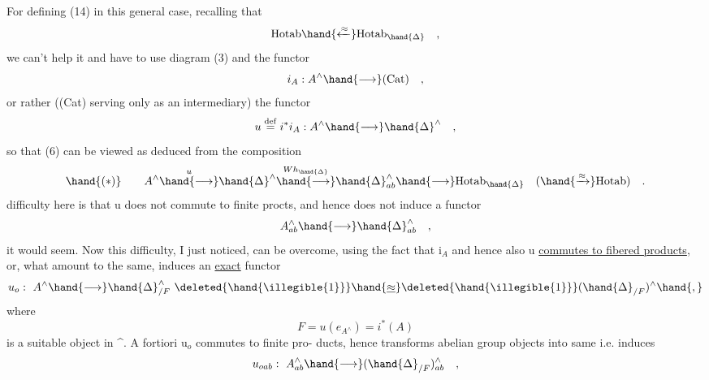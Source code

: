 For defining (14) in this general case, recalling that
\[ \mathrm{Hotab} \hand{\xleftarrow{\approx}} \mathrm{Hotab}_{\hand{\Delta}} \quad , \]
we can't help it and have to use diagram (3) and the functor
\[ i_{A} : A^{\wedge} \hand{\longrightarrow} (\mathrm{Cat}) \quad , \]
or rather ((Cat) serving only as an intermediary) the functor
\[ u \overset{\mathrm{def}}{=} i^{*} i_{A} : A^{\wedge} \hand{\longrightarrow} \hand{\Delta}^{\wedge} \quad , \]
so that (6) can be viewed as  deduced  from the
composition
\[ \hand{(*)} \qquad A^{\wedge} \overset{u}{\hand{\longrightarrow}} \hand{\Delta}^{\wedge} \overset{Wh_{\hand{\Delta}}}{\hand{\longrightarrow}} \hand{\Delta}^{\wedge}_{ab} \hand{\longrightarrow} \mathrm{Hotab}_{\hand{\Delta}} \quad ( \hand{\xrightarrow{\approx}} \mathrm{Hotab} ) \quad . \]
 difficulty here is that u does not commute to finite procts,
and hence does not induce a functor\xout{,} 
\[ A^{\wedge}_{ab} \hand{\longrightarrow} \hand{\Delta}^{\wedge}_{ab} \quad , \]
it would seem. Now this difficulty, I just noticed, can be overcome,
using the fact that i$_{A}$ and hence also u \uline{commutes to fibered products},
or, what amount to the same, induces an \uline{exact} functor
\[ u_{o} :\ A^{\wedge} \hand{\longrightarrow} \hand{\Delta}^{\wedge}_{/F} \ \deleted{\hand{\illegible{1}}}\hand{\underline{\approx}}\deleted{\hand{\illegible{1}}} (\hand{\Delta}_{/F})^{\wedge} \hand{,} \]
\margin{$\underline{\approx}$}
where
\[ F = u(e_{A^{\wedge}}) = i^{*}(A) \]
is a suitable object in \hand{$\Delta$}\^{}. A fortiori u$_{o}$ commutes to finite pro-%
ducts, hence transforms abelian group objects into same i.e. induces
\[ u_{oab} :\ A^{\wedge}_{ab} \hand{\longrightarrow} (\hand{\Delta}_{/F})^{\wedge}_{ab} \quad , \]


